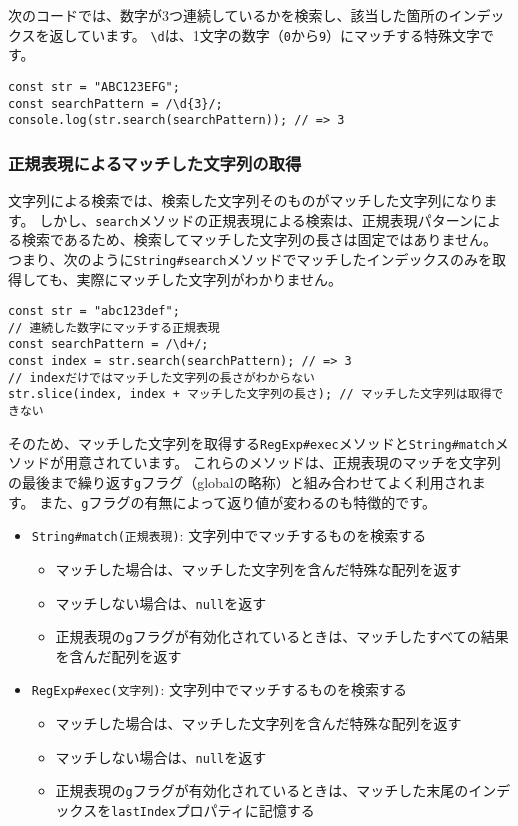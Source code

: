 次のコードでは、数字が3つ連続しているかを検索し、該当した箇所のインデックスを返しています。
\texttt{\textbackslash d}は、1文字の数字（\texttt{0}から\texttt{9}）にマッチする特殊文字です。

\begin{lstlisting}
const str = "ABC123EFG";
const searchPattern = /\d{3}/;
console.log(str.search(searchPattern)); // => 3
\end{lstlisting}

\hypertarget{match-by-regexp}{%
\subsubsection{正規表現によるマッチした文字列の取得}\label{match-by-regexp}}

文字列による検索では、検索した文字列そのものがマッチした文字列になります。
しかし、\texttt{search}メソッドの正規表現による検索は、正規表現パターンによる検索であるため、検索してマッチした文字列の長さは固定ではありません。
つまり、次のように\texttt{String\#search}メソッドでマッチしたインデックスのみを取得しても、実際にマッチした文字列がわかりません。

\begin{lstlisting}
const str = "abc123def";
// 連続した数字にマッチする正規表現
const searchPattern = /\d+/;
const index = str.search(searchPattern); // => 3
// indexだけではマッチした文字列の長さがわからない
str.slice(index, index + マッチした文字列の長さ); // マッチした文字列は取得できない
\end{lstlisting}

そのため、マッチした文字列を取得する\texttt{RegExp\#exec}メソッドと\texttt{String\#match}メソッドが用意されています。
これらのメソッドは、正規表現のマッチを文字列の最後まで繰り返す\texttt{g}フラグ（globalの略称）と組み合わせてよく利用されます。
また、\texttt{g}フラグの有無によって返り値が変わるのも特徴的です。

\begin{itemize}
\item
  \texttt{String\#match(正規表現)}:
  文字列中でマッチするものを検索する

  \begin{itemize}
  \item
    マッチした場合は、マッチした文字列を含んだ特殊な配列を返す
  \item
    マッチしない場合は、\texttt{null}を返す
  \item
    正規表現の\texttt{g}フラグが有効化されているときは、マッチしたすべての結果を含んだ配列を返す
  \end{itemize}
\item
  \texttt{RegExp\#exec(文字列)}:
  文字列中でマッチするものを検索する

  \begin{itemize}
  \item
    マッチした場合は、マッチした文字列を含んだ特殊な配列を返す
  \item
    マッチしない場合は、\texttt{null}を返す
  \item
    正規表現の\texttt{g}フラグが有効化されているときは、マッチした末尾のインデックスを\texttt{lastIndex}プロパティに記憶する
  \end{itemize}
\end{itemize}

